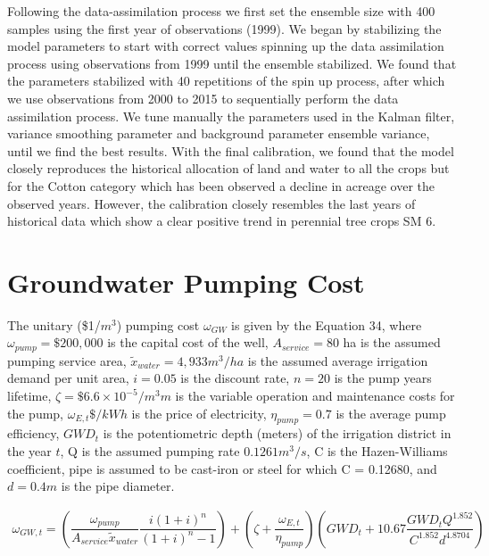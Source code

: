 \documentclass[11pt,a4paper]{article}
\begin{document}
Following the data-assimilation process we first set the ensemble size with 400 samples using the first year of observations (1999). We began by stabilizing the model parameters to start with correct values spinning up the data assimilation process using observations from 1999 until the ensemble stabilized. We found that the parameters stabilized with 40 repetitions of the spin up process, after which we use observations from 2000 to 2015 to sequentially perform the data assimilation process. We tune manually the parameters used in the Kalman filter, variance smoothing parameter and background parameter ensemble variance, until we find the best results. With the final calibration, we found that the model closely reproduces the historical allocation of land and water to all the crops but for the Cotton category which has been observed a decline in acreage over the observed years. However, the calibration closely resembles the last years of historical data which show a clear positive trend in perennial tree crops SM 6. 

\section{Groundwater Pumping Cost}

The unitary (\$1/$m^3$) pumping cost $\omega_{GW}$ is given by the Equation 34, where $\omega_{pump}= \$200,000$ is the capital cost of the well, $A_{service}=80$ ha is the assumed pumping service area, $\widetilde{x}_{water}=4,933 m^3/ ha$ is the assumed average irrigation demand per unit area, $i=0.05$ is the discount rate, $n=20$ is the pump years lifetime, $\zeta= \$6.6\times10^{-5} /m^3 m$ is the variable operation and maintenance costs for the pump, $\omega_{E,t} \$/kWh$ is the price of electricity, $\eta_{pump}=0.7$ is the average pump efficiency, $GWD_t$ is the potentiometric depth (meters) of the irrigation district in the year $t$, Q is the assumed pumping rate $0.1261 m^3/s$, C is the Hazen-Williams coefficient, pipe is assumed to be cast-iron or steel for which C = 0.12680, and $d=0.4 m$ is the pipe diameter.

\begin{equation}
\begin{gathered}
\omega_{GW,t} = \left( \dfrac{\omega_{pump}}{A_{service} \widetilde{x}_{water}} \dfrac{i(1+i)^n}{(1+i)^n-1}\right) 
+ \left(\zeta+\dfrac{\omega_{E,t}}{\eta_{pump}} \right) \left(GWD_t +10.67  \dfrac{GWD_t Q^{1.852}}{C^{1.852} d^{4.8704}}\right)
\end{gathered}
\end{equation}    
\end{document}
